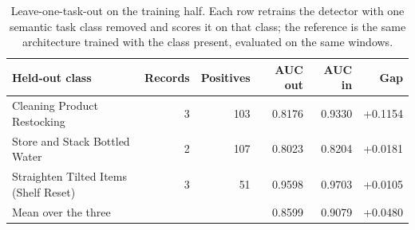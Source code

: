 \begin{table}[htbp]
\centering
\caption{Leave-one-task-out on the training half. Each row retrains the detector with one
semantic task class removed and scores it on that class; the reference is the same
architecture trained with the class present, evaluated on the same windows.}
\label{tab:loto}
\footnotesize
\begin{tabular}{lrrrrr}
\toprule
Held-out class & Records & Positives & AUC out & AUC in & Gap \\
\midrule
Cleaning Product Restocking & 3 & 103 & 0.8176 & 0.9330 & +0.1154 \\
Store and Stack Bottled Water & 2 & 107 & 0.8023 & 0.8204 & +0.0181 \\
Straighten Tilted Items (Shelf Reset) & 3 & 51 & 0.9598 & 0.9703 & +0.0105 \\
\midrule
Mean over the three & & & 0.8599 & 0.9079 & +0.0480 \\
\bottomrule
\end{tabular}
\end{table}
